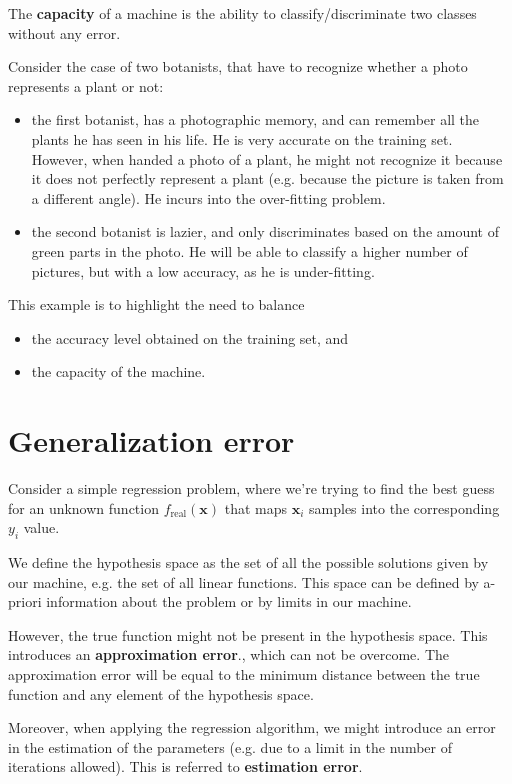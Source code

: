\documentclass[oneside,onecolumn]{report}
\begin{document}
The \textbf{capacity} of a machine is the ability to classify/discriminate two classes without any error.

Consider the case of two botanists, that have to recognize whether a photo represents a plant or not:
\begin{itemize}
    \item the first botanist, has a photographic memory, and can remember all the plants he has seen in his life. He is very accurate on the training set. However, when handed a photo of a plant, he might not recognize it because it does not perfectly represent a plant (e.g. because the picture is taken from a different angle). He incurs into the over-fitting problem.
    \item the second botanist is lazier, and only discriminates based on the amount of green parts in the photo. He will be able to classify a higher number of pictures, but with a low accuracy, as he is under-fitting.
\end{itemize}

This example is to highlight the need to balance
\begin{itemize}
    \item the accuracy level obtained on the training set, and
    \item the capacity of the machine.
\end{itemize}

\section{Generalization error}
Consider a simple regression problem, where we're trying to find the best guess for an unknown function $f_\text{real}(\bm x)$ that maps $\bm x_i$ samples into the corresponding $y_i$ value.

We define the hypothesis space as the set of all the possible solutions given by our machine, e.g. the set of all linear functions.
This space can be defined by a-priori information about the problem or by limits in our machine.

However, the true function might not be present in the hypothesis space.
This introduces an \textbf{approximation error}., which can not be overcome.
The approximation error will be equal to the minimum distance between the true function and any element of the hypothesis space.

Moreover, when applying the regression algorithm, we might introduce an error in the estimation of the parameters (e.g. due to a limit in the number of iterations allowed).
This is referred to \textbf{estimation error}.
\end{document}
